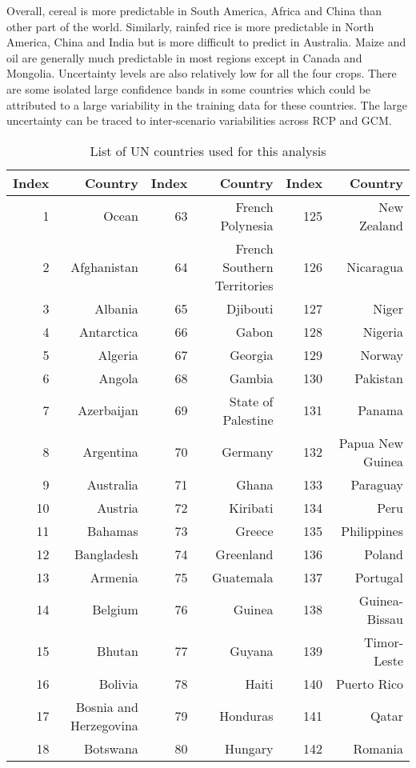 Overall, cereal is more predictable in South America, Africa and China than other part of the world. Similarly, rainfed rice is more predictable in North America, China and India but is more difficult to predict in Australia. Maize and oil are generally much predictable in most regions except in Canada and Mongolia. Uncertainty levels are also relatively low for all the four crops. There are some isolated large confidence bands in some countries which could be attributed to a large variability in the training data for these countries. The large uncertainty can be traced to inter-scenario variabilities across RCP and GCM.
 
\begin{table}[ht]
\caption{List of UN countries used for this analysis}\label{country}
\scriptsize
\begin{tabular}{r|r|r|r|r|r|}
\hline
Index&Country &Index&Country&Index&Country\\ 
\hline
1 &Ocean & 63 & French Polynesia & 125& New Zealand \\ 
2 & Afghanistan & 64 & French Southern Territories & 126& Nicaragua \\ 
3 & Albania & 65 & Djibouti & 127& Niger \\ 
4 & Antarctica & 66 & Gabon & 128 &Nigeria \\
5 & Algeria & 67 & Georgia & 129& Norway \\ 
6 & Angola & 68 & Gambia & 130& Pakistan \\ 
7 & Azerbaijan &69 & State of Palestine & 131& Panama \\ 
8 & Argentina & 70 & Germany & 132& Papua New Guinea \\ 
9 & Australia & 71 & Ghana & 133& Paraguay \\ 
10 & Austria & 72 & Kiribati & 134& Peru \\ 
11 & Bahamas & 73 & Greece & 135& Philippines \\ 
12 & Bangladesh & 74 & Greenland & 136 &Poland \\ 
13 & Armenia & 75 & Guatemala & 137& Portugal \\ 
14 & Belgium & 76 & Guinea & 138 & Guinea-Bissau \\ 
15 & Bhutan & 77 & Guyana & 139& Timor-Leste \\ 
16 & Bolivia & 78 & Haiti & 140& Puerto Rico \\ 
17 & Bosnia and Herzegovina & 79 & Honduras & 141& Qatar \\ 
18 & Botswana & 80 & Hungary & 142& Romania \\ 

\end{tabular}
\end{table}
